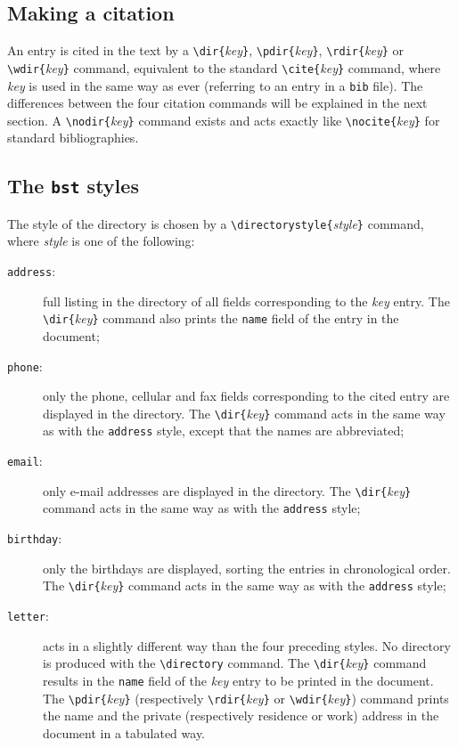 \documentclass[10pt]{article}
\begin{document}
\subsection{Making a citation}

An entry is cited in the text by a \verb'\dir{'\emph{key}\verb'}',  
\verb'\pdir{'\emph{key}\verb'}', \verb'\rdir{'\emph{key}\verb'}' or
\verb'\wdir{'\emph{key}\verb'}' command, equivalent to the standard
\verb'\cite{'\emph{key}\verb'}' command, where \emph{key} is used in the same
way as ever (referring to an entry in a \texttt{bib} file). 
The differences between the four citation commands will be explained in the next
section.
A \verb'\nodir{'\emph{key}\verb'}' command exists and acts exactly like
\verb'\nocite{'\emph{key}\verb'}' for standard bibliographies.

\subsection{The \texttt{bst} styles}

The style of the directory is chosen by a \verb'\directorystyle{'\emph{style}\verb'}'  
command, where \emph{style} is one of the following:
\begin{description}
\item[\textmd{\texttt{address}:}] 
full listing in the directory of all fields corresponding to the
\emph{key} entry. The \verb'\dir{'\emph{key}\verb'}' command also prints the
\texttt{name} field of the entry in the document;  
\item[\textmd{\texttt{phone}:}] 
only the phone, cellular and fax fields corresponding to the cited entry are
displayed in the directory. The \verb'\dir{'\emph{key}\verb'}' command acts in
the same way as with the \texttt{address} style, except that the names are
abbreviated; 
\item[\textmd{\texttt{email}:}] 
only e-mail addresses are displayed in the directory. The
\verb'\dir{'\emph{key}\verb'}' command acts in the same way as with the
\texttt{address} style;
\item[\textmd{\texttt{birthday}:}] 
only the birthdays are displayed, sorting the entries in chronological
order. The \verb'\dir{'\emph{key}\verb'}' command acts in the same way as with
the \texttt{address} style;
\item[\textmd{\texttt{letter}:}] 
acts in a slightly different way than the four preceding styles. No directory
is produced with the \verb|\directory| command. The
\verb'\dir{'\emph{key}\verb'}' command results in the \texttt{name} field of
the \emph{key} entry to be printed in the document. The
\verb'\pdir{'\emph{key}\verb'}' (respectively \verb'\rdir{'\emph{key}\verb'}'
or \verb'\wdir{'\emph{key}\verb'}') command prints the name and the private
(respectively residence or work) address in the document in a tabulated way.
\end{description}
\end{document}
